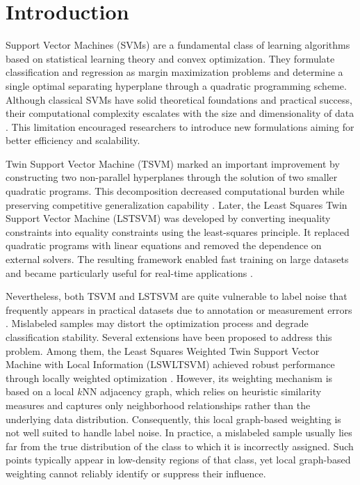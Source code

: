 \documentclass[twoside]{article}
\begin{document}
\section{Introduction}
Support Vector Machines (SVMs) are a fundamental class of learning algorithms based on statistical learning theory and convex optimization. They formulate classification and regression as margin maximization problems and determine a single optimal separating hyperplane through a quadratic programming scheme. Although classical SVMs have solid theoretical foundations and practical success, their computational complexity escalates with the size and dimensionality of data \cite{Tanveer2020,Tian2013}. This limitation encouraged researchers to introduce new formulations aiming for better efficiency and scalability.

Twin Support Vector Machine (TSVM) marked an important improvement by constructing two non-parallel hyperplanes through the solution of two smaller quadratic programs. This decomposition decreased computational burden while preserving competitive generalization capability \cite{Quadir2025,Leone2023}. Later, the Least Squares Twin Support Vector Machine (LSTSVM) was developed by converting inequality constraints into equality constraints using the least-squares principle. It replaced quadratic programs with linear equations and removed the dependence on external solvers. The resulting framework enabled fast training on large datasets and became particularly useful for real-time applications \cite{Fongmun2025,Hua2015,Tanveer2016}.

Nevertheless, both TSVM and LSTSVM are quite vulnerable to label noise that frequently appears in practical datasets due to annotation or measurement errors \cite{Zhu2023Noise}. Mislabeled samples may distort the optimization process and degrade classification stability. Several extensions have been proposed to address this problem. Among them, the Least Squares Weighted Twin Support Vector Machine with Local Information (LSWLTSVM) achieved robust performance through locally weighted optimization \cite{Hua2015}. However, its weighting mechanism is based on a local $k$NN adjacency graph, which relies on heuristic similarity measures and captures only neighborhood relationships rather than the underlying data distribution. Consequently, this local graph-based weighting is not well suited to handle label noise. In practice, a mislabeled sample usually lies far from the true distribution of the class to which it is incorrectly assigned. Such points typically appear in low-density regions of that class, yet local graph-based weighting cannot reliably identify or suppress their influence.
\end{document}
